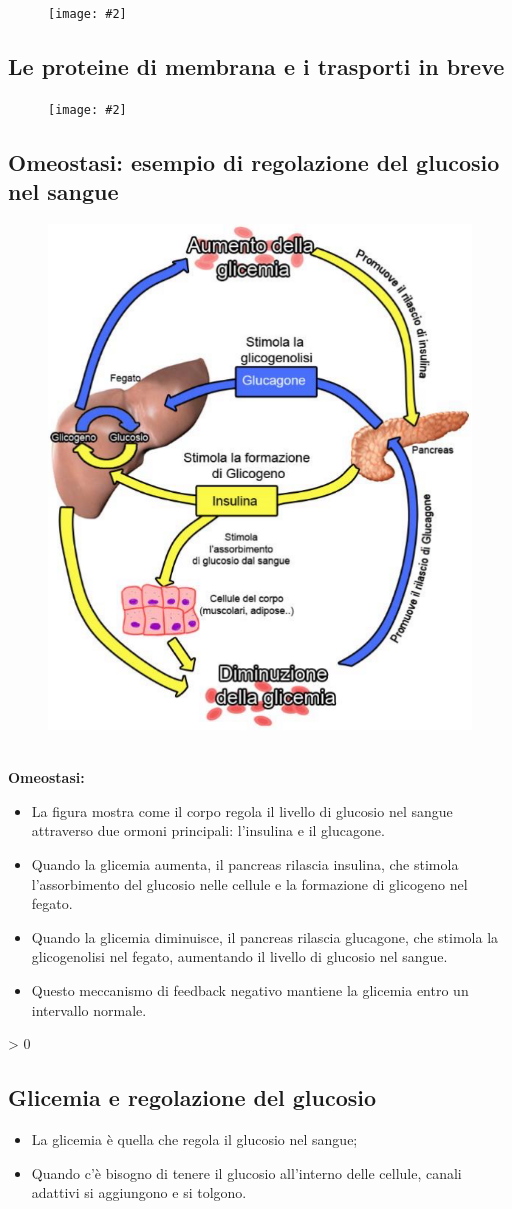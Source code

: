 \documentclass{article}
\makeatletter
\newcommand{\wrapfill}{
    \par
    \ifnum \value{WF@wrappedlines} > 0
        \addtocounter{WF@wrappedlines}{-1}%
        \null\vspace{
            \arabic{WF@wrappedlines}
            \baselineskip
        }
        \WFclear
    \fi
    \phantom{}
}
\newcommand{\cfig}[2]{
    \phantom{}
    \begin{figure}[ht!]
        \begin{center}
            \texttt{[image: \#2]}
        \end{center}
    \end{figure}
}
\makeatother
\begin{document}
\cfig{1}{media/pompa-sodio-potassio.png}

\subsection{Le proteine di membrana e i trasporti in breve}
\cfig{1}{media/schema.png}

\newpage
\subsection{Omeostasi: esempio di regolazione del glucosio nel sangue}
\setlength{\intextsep}{0pt}%
\begin{figure}
    \includegraphics[width=.4\textwidth]{media/omeostasi.png}
    \vspace{-2.4cm}
\end{figure}
\phantom{}\\
\textbf{Omeostasi:}
\begin{itemize}
    \item La figura mostra come il corpo regola il livello di glucosio nel sangue attraverso due
        ormoni principali: l'insulina e il glucagone.
    \item Quando la glicemia aumenta, il pancreas rilascia insulina, che stimola l'assorbimento
        del glucosio nelle cellule e la formazione di glicogeno nel fegato.
    \item Quando la glicemia diminuisce, il pancreas rilascia glucagone, che stimola la
        glicogenolisi nel fegato, aumentando il livello di glucosio nel sangue.
    \item Questo meccanismo di feedback negativo mantiene la glicemia entro un intervallo
        normale.
\end{itemize}
\wrapfill

\subsection{Glicemia e regolazione del glucosio}
\begin{itemize}
    \item La glicemia è quella che regola il glucosio nel sangue;
    \item Quando c'è bisogno di tenere il glucosio all'interno delle cellule, canali adattivi
        si aggiungono e si tolgono.
\end{itemize}
\end{document}
